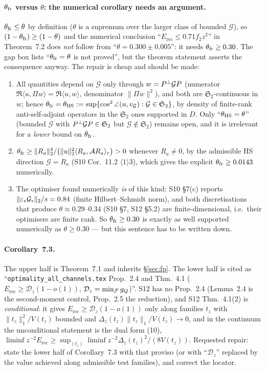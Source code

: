 \documentclass[11pt]{article}
\newcommand{\Stwo}{\mathfrak S_2}\newcommand{\Sone}{\mathfrak S_1}
\newcommand{\norm}[1]{\lVert #1\rVert}\newcommand{\abs}[1]{\lvert #1\rvert}
\newcommand{\ip}[2]{\langle #1,#2\rangle}\newcommand{\one}{\mathbf 1}
\newcommand{\Erec}{E_{\mathrm{rec}}}\newcommand{\Gs}{\mathcal G}
\begin{document}
\paragraph{$\theta_{\rm fr}$ versus $\theta$: the numerical corollary needs an argument.}
$\theta_{\rm fr}\le\theta$ by definition ($\theta$ is a supremum over the larger class of
bounded $\Gs$), so $(1-\theta_{\rm fr})\ge(1-\theta)$ and the numerical conclusion
``$\Erec\le0.71f_2z^2$'' in Theorem~7.2 does \emph{not} follow from
``$\theta=0.300\pm0.005$'': it needs $\theta_{\rm fr}\ge0.30$.  The gap box lists
``$\theta_{\rm fr}=\theta$ is not proved'', but the theorem statement asserts the
consequence anyway.  The repair is cheap and should be made:
\begin{enumerate}[leftmargin=1.8em,itemsep=1pt]
\item All quantities depend on $\Gs$ only through $w=\Pperp\Gs P$ (numerator
 $\Re\ip u{\Pi w}=\Re\ip uw$, denominator $\norm{\Pi w}^2$), and both are $\Stwo$-continuous
 in $w$; hence $\theta_{\rm fr}=\theta_{\rm HS}:=\sup\{\cos^2\angle(u,v_\Gs):\Gs\in\Stwo\}$,
 by density of finite-rank anti-self-adjoint operators in the $\Stwo$ ones supported in $D$.
 Only ``$\theta_{\rm HS}=\theta$'' (bounded $\Gs$ with $\Pperp\Gs P\in\Stwo$ but $\Gs\notin\Stwo$)
 remains open, and it is irrelevant for a \emph{lower} bound on $\theta_{\rm fr}$.
\item $\theta_{\rm fr}\ge\norm{R_a}_2^4/\bigl(\norm u_2^2\ip{R_a}{\mathcal AR_a}_r\bigr)>0$
 whenever $R_a\ne0$, by the admissible HS direction $\Gs=R_a$ (S10 Cor.~11.2
 $\langle1\rangle3$), which gives the explicit $\theta_{\rm fr}\ge0.0143$ numerically.
\item The optimiser found numerically \emph{is} of this kind: S10 \S7(c) reports
 $\norm{\eps_*\Gs_*}_2/s=0.84$ (finite Hilbert--Schmidt norm), and both discretisations that
 produce $\theta\approx0.29$--$0.34$ (S10 \S7, S12 \S5.2) are finite-dimensional, i.e.\ their
 optimisers are finite rank.  So $\theta_{\rm fr}\ge0.30$ is exactly as well supported
 numerically as $\theta\ge0.30$ --- but this sentence has to be written down.
\end{enumerate}

\paragraph{Corollary~7.3.}  The upper half is Theorem~7.1 and inherits \S\ref{sec:fp}.  The
lower half is cited as ``\texttt{optimality\_all\_channels.tex} Prop.~2.4 and Thm.~4.1
($\Erec\ge\mathcal D_z(1-o(1))$, $\mathcal D_z=\min_\mathcal F g_Q$)''.  S12 has no Prop.~2.4
(Lemma~2.4 is the second-moment control, Prop.~2.5 the reduction), and S12 Thm.~4.1(2) is
\emph{conditional}: it gives $\Erec\ge\mathcal D_z(1-o(1))$ only along families $t_z$ with
$\norm{t_z}_1^2/V(t_z)$ bounded and $\Delta_z(t_z)\norm{t_z}_1/V(t_z)\to0$, and in the
continuum the unconditional statement is the dual form (10),
$\liminf z^{-2}\Erec\ge\sup_{(t_z)}\liminf z^{-2}\Delta_z(t_z)^2/(8V(t_z))$.  Requested
repair: state the lower half of Corollary~7.3 with that proviso (or with ``$\mathcal D_z$''
replaced by the value achieved along admissible test families), and correct the locator.
\end{document}
